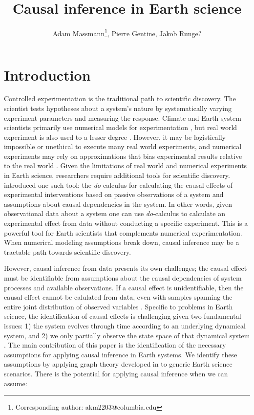 \documentclass[12pt]{article}
\begin{document}
\title{Causal inference in Earth science}

\author{Adam Massmann\thanks{Corresponding author:
    akm2203@columbia.edu}, Pierre Gentine, Jakob Runge?}

\maketitle

\section{Introduction}

Controlled experimentation is the traditional path to scientific
discovery. The scientist tests hypotheses about a system's nature by
systematically varying experiment parameters and measuring the
response. Climate and Earth system scientists primarily use numerical
models for experimentation \citep[e.g.,][]{eyring-cmip6-2016}, but
real world experiment is also used to a lesser degree
\citep[e.g.,][]{ainsworth-face-2005}. However, it may be logistically
impossible or unethical to execute many real world experiments, and
numerical experiments may rely on approximations that bias
experimental results relative to the real world
\citep[e.g.,][]{kim-cmip5,stillmann-cmip5-extremes}. Given the
limitations of real world and numerical experiments in Earth science,
researchers require additional tools for scientific discovery.
\citet{pearl-1994-do-calculus} introduced one such tool: the
\textit{do-}calculus for calculating the causal effects of
experimental interventions based on passive observations of a system
and assumptions about causal dependencies in the system. In other
words, given observational data about a system one can use
\textit{do}-calculus to calculate an experimental effect from data
without conducting a specific experiment. This is a powerful tool for
Earth scientists that complements numerical experimentation. When
numerical modeling assumptions break down, causal inference may be a
tractable path towards scientific discovery.

However, causal inference from data presents its own challenges; the
causal effect must be identifiable from assumptions about the causal
dependencies of system processes and available observations. If a
causal effect is unidentifiable, then the causal effect cannot be
calulated from data, even with samples spanning the entire joint
distribution of observed variables \citep[][]{shpitser2006}. Specific
to problems in Earth science, the identification of causal effects is
challenging given two fundamental issues: 1) the system evolves
through time according to an underlying dynamical system, and 2) we
only partially observe the state space of that dynamical system
\citep{majda-state}. The main contribution of this paper is the
identification of the necessary assumptions for applying causal
inference in Earth systems. We identify these assumptions by applying
graph theory developed in \citet{pearl1995causal} to generic Earth
science scenarios. There is the potential for applying causal
inference when we can assume:
\end{document}

